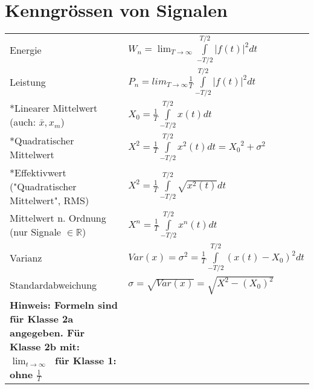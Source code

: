 \section{Kenngrössen von Signalen}
\begin{tabular}{p{6cm}p{12cm}}
  Energie                                                            &
  $W_n = \lim_{T \to \infty}  \int \limits _{-T/2} ^{T/2} |f(t)|^2 dt$            \\
  \rowcolor{TabularBackgroundColor}
  Leistung                                                           &
  $P_n = lim_{T \to \infty} \frac{1}{T} \int \limits _{-T/2} ^{T/2} |f(t)|^2 dt$  \\
  *Linearer Mittelwert
  \newline \tiny(auch: $ \bar{x}, x_m$)                              &
  $X_0 = \frac{1}{T} \int \limits _{-T/2}^{T/2} x(t) dt $                         \\
  \rowcolor{TabularBackgroundColor}
  *Quadratischer Mittelwert                                          &
  $X^2 = \frac{1}{T} \int \limits _{-T/2}^{T/2} x^2(t) dt = {X_0}^2 + \sigma^2 $                        \\
  *Effektivwert \newline \tiny{("Quadratischer Mittelwert", RMS)}    &
  $X^2 = \frac{1}{T} \int \limits _{-T/2}^{T/2} \sqrt{x^2(t)} dt $                \\
  \rowcolor{TabularBackgroundColor}
  Mittelwert n. Ordnung \newline \tiny(nur Signale $\in \mathbb{R}$) &
  $X^n = \frac{1}{T} \int \limits _{-T/2} ^{T/2} x^n(t)dt$                        \\
  Varianz                                                            &
  $Var(x) = \sigma^2 = \frac{1}{T} \int \limits _{-T/2} ^{T/2} (x(t) - X_0)^2 dt$ \\
  \rowcolor{TabularBackgroundColor}
  Standardabweichung                                                 &
  $\sigma = \sqrt{Var(x)} = \sqrt{X^2 - (X_0)^2}$                                 \\
  \textbf{\tiny *Hinweis: Formeln sind für Klasse 2a angegeben. \newline
  Für Klasse 2b mit: $\lim_{t \to \infty}\;$ für Klasse 1: ohne $\frac{1}{T}$ }
\end{tabular}

